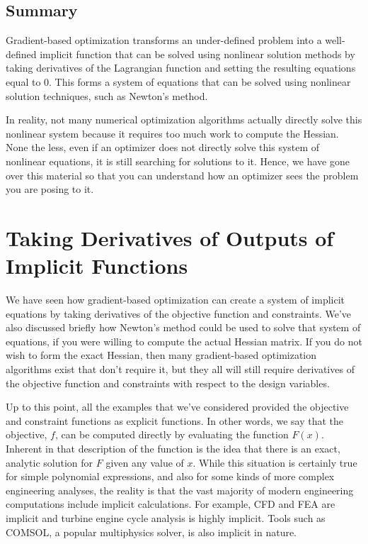 \documentclass[conf]{new-aiaa}
\begin{document}
    \subsection{Summary}
    Gradient-based optimization transforms an under-defined problem into a well-defined implicit function that can be solved using nonlinear solution methods by taking derivatives of the Lagrangian function and setting the resulting equations equal to 0. 
    This forms a system of equations that can be solved using nonlinear solution techniques, such as Newton's method. 

    In reality, not many numerical optimization algorithms actually directly solve this nonlinear system because it requires too much work to compute the Hessian. 
    None the less, even if an optimizer does not directly solve this system of nonlinear equations, it is still searching for solutions to it. 
    Hence, we have gone over this material so that you can understand how an optimizer sees the problem you are posing to it. 

    \section{Taking Derivatives of Outputs of Implicit Functions}
    \label{sec:taking_derivs_of_implicit_functions}

    We have seen how gradient-based optimization can create a system of implicit equations by taking derivatives of the objective function and constraints. We've also discussed briefly how Newton's method could be used to solve that system of equations, if you were willing to compute the actual Hessian matrix.
    If you do not wish to form the exact Hessian, then many gradient-based optimization algorithms exist that don't require it, 
    but they all will still require derivatives of the objective function and constraints with respect to the design variables. 

    Up to this point, all the examples that we've considered provided the objective and constraint functions as explicit functions. 
    In other words, we say that the objective, $f$, can be computed directly by evaluating the function $F(x)$. 
    Inherent in that description of the function is the idea that there is an exact, analytic solution for $F$ given any value of $x$. 
    While this situation is certainly true for simple polynomial expressions, and also for some kinds of more complex engineering analyses, 
    the reality is that the vast majority of modern engineering computations include implicit calculations. 
    For example, CFD and FEA are implicit and turbine engine cycle analysis is highly implicit. 
    Tools such as COMSOL, a popular multiphysics solver, is also implicit in nature. 
\end{document}
